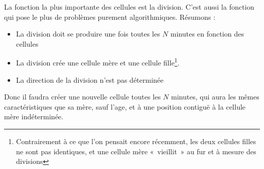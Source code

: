 La fonction la plus importante des cellules est la division. C'est aussi la fonction qui pose le plus de problèmes purement algorithmiques. Résumons :
\begin{itemize}
  \item La division doit se produire une fois toutes les $N$ minutes en fonction des cellules
  \item La division crée une cellule mère et une cellule fille\footnote{Contrairement à ce que l'on pensait encore récemment, les deux cellules filles ne sont pas identiques, et une cellule mère «~vieillit~» au fur et à mesure des divisions}.
  \item La direction de la division n'est pas déterminée
\end{itemize}

  Donc il faudra créer une nouvelle cellule toutes les $N$ minutes, qui aura les mêmes caractéristiques que sa mère, sauf l'age, et à une position contiguë à la cellule mère indéterminée.
  
